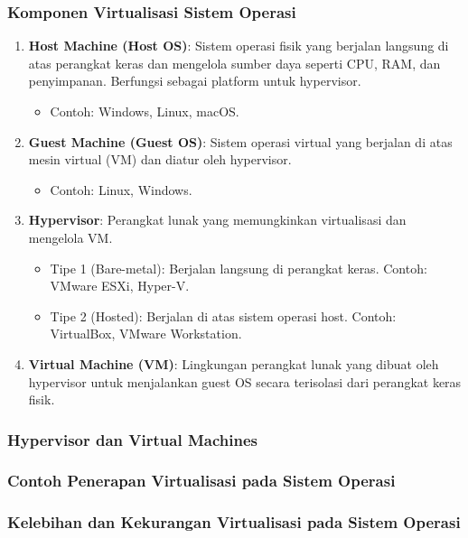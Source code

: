 \documentclass[12pt]{article}
\begin{document}
\subsubsection{Komponen Virtualisasi Sistem Operasi}
\begin{enumerate}
    \item \textbf{Host Machine (Host OS)}:
        Sistem operasi fisik yang berjalan langsung di atas perangkat keras dan mengelola sumber daya seperti CPU, RAM, dan penyimpanan. Berfungsi sebagai platform untuk hypervisor.
    \begin{itemize}
        \item Contoh: Windows, Linux, macOS.
    \end{itemize}
    
    \item \textbf{Guest Machine (Guest OS)}:
        Sistem operasi virtual yang berjalan di atas mesin virtual (VM) dan diatur oleh hypervisor. 
    \begin{itemize}
        \item Contoh: Linux, Windows.
    \end{itemize}
    
    \item \textbf{Hypervisor}:
    Perangkat lunak yang memungkinkan virtualisasi dan mengelola VM.
    \begin{itemize}
        \item Tipe 1 (Bare-metal): Berjalan langsung di perangkat keras. Contoh: VMware ESXi, Hyper-V.
        \item Tipe 2 (Hosted): Berjalan di atas sistem operasi host. Contoh: VirtualBox, VMware Workstation.
    \end{itemize}
    
    \item \textbf{Virtual Machine (VM)}:
    Lingkungan perangkat lunak yang dibuat oleh hypervisor untuk menjalankan guest OS secara terisolasi dari perangkat keras fisik.
\end{enumerate}

\subsubsection{Hypervisor dan Virtual Machines}
\subsubsection{Contoh Penerapan Virtualisasi pada Sistem Operasi}
\subsubsection{Kelebihan dan Kekurangan Virtualisasi pada Sistem Operasi}
\end{document}
